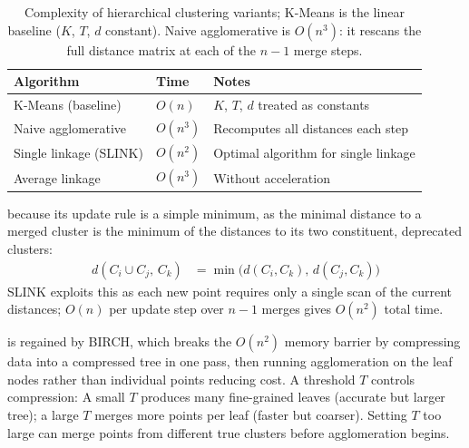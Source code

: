 \begin{table}[ht]
\centering
\begin{tabular}{p{}p{}p{}}
    \toprule
    \textbf{Algorithm} & \textbf{Time} & \textbf{Notes} \\
    \midrule
    K-Means (baseline)         & $O(n)$           & $K$, $T$, $d$ treated as constants \\
    Naive agglomerative        & $O(n^3)$         & Recomputes all distances each step \\
    Single linkage (SLINK)     & $O(n^2)$         & Optimal algorithm for single linkage \\
    Average linkage & $O(n^3)$  & Without acceleration \\
    \bottomrule
\end{tabular}
\vspace{2em}
\caption{Complexity of hierarchical clustering variants; K-Means is the linear baseline ($K$, $T$, $d$ constant).
Naive agglomerative is $O(n^3)$: it rescans the full distance matrix at each of the $n{-}1$ merge steps.}
\label{tab:hc_complexity}
\end{table}


\vspace{2.5em}
 because its update 
rule is a simple minimum, as the minimal distance to a merged cluster is the minimum of the 
distances to its two constituent, deprecated clusters:
\begin{align*}
    d(C_i \cup C_j,\, C_k) &= \min\bigl(d(C_i,C_k),\, d(C_j,C_k)\bigr)
\end{align*}
SLINK\cite{Sibson1973} exploits this as 
each new point requires only a single scan of the current distances; $O(n)$ 
per update step over $n{-}1$ merges gives $O(n^2)$ total time.

\vspace{2.5em}
 is regained by
BIRCH\cite{Zhang1996}, which breaks the $O(n^2)$ memory barrier by compressing 
data into a compressed tree in one pass, then running agglomeration on the leaf nodes rather 
than individual points reducing cost. A threshold $T$ controls compression: 
A small $T$ produces many fine-grained 
leaves (accurate but larger tree); a large $T$ merges more points per leaf (faster but coarser). 
Setting $T$ too large can merge points from different true clusters before agglomeration begins.












